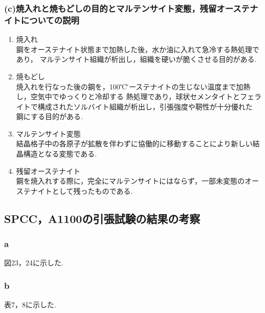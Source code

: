 \documentclass[10pt，a4j]{jsarticle}
\begin{document}
    \subsubsection{(c)焼入れと焼もどしの目的とマルテンサイト変態，残留オーステナイトについての説明}
      \begin{enumerate}
        \item 焼入れ \\
          鋼をオーステナイト状態まで加熱した後，水か油に入れて急冷する熱処理であり，
          マルテンサイト組織が析出し，組織を硬いが脆くさせる目的がある.
        \item 焼もどし \\
          焼入れを行なった後の鋼を，100℃\~オーステナイトの生じない温度まで加熱し，空気中でゆっくりと冷却する
          熱処理であり，球状セメンタイトとフェライトで構成されたソルバイト組織が析出し，引張強度や靭性が十分優れた
          鋼にする目的がある.
        \item マルテンサイト変態 \\
          結晶格子中の各原子が拡散を伴わずに協働的に移動することにより新しい結晶構造となる変態である.
        \item 残留オーステナイト \\
          鋼を焼入れする際に，完全にマルテンサイトにはならず，一部未変態のオーステナイトとして残ったものである.
      \end{enumerate}  

  \subsection{SPCC，A1100の引張試験の結果の考察}
    \subsubsection{a}
      図23，24に示した.
    \subsubsection{b}
      表7，8に示した.
\end{document}
